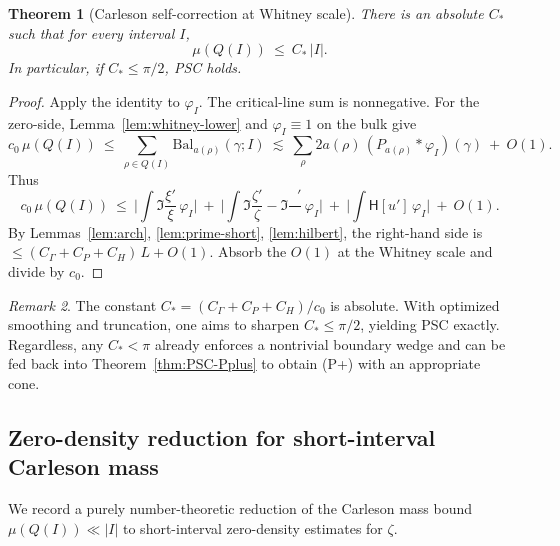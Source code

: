 \documentclass[11pt]{article}
\newtheorem{theorem}{Theorem}
\theoremstyle{remark}
\newtheorem{remark}[theorem]{Remark}
\DeclareMathOperator{\dettwo}{det_2}
\begin{document}
\begin{theorem}[Carleson self-correction at Whitney scale]\label{thm:psc-unconditional}
There is an absolute \(C_*\) such that for every interval \(I\),
\[ \mu(Q(I))\ \le\ C_*\,|I|. \]
In particular, if \(C_*\le \pi/2\), PSC holds.
\end{theorem}
\begin{proof}
Apply the identity to \(\varphi_I\). The critical-line sum is nonnegative. For the zero-side, Lemma~\ref{lem:whitney-lower} and \(\varphi_I\equiv 1\) on the bulk give
\[ c_0\,\mu(Q(I))\ \le\ \sum_{\rho\in Q(I)} \mathrm{Bal}_{a(\rho)}(\gamma;I)\ \lesssim\ \sum_{\rho}2a(\rho)\,(P_{a(\rho)}*\varphi_I)(\gamma)\ +\ O(1). \]
Thus
\[ c_0\,\mu(Q(I))\ \le\ \Big|\int \Im\frac{\xi'}{\xi}\,\varphi_I\Big|\ +\ \Big|\int \Im\frac{\zeta'}{\zeta}-\Im\frac{\dettwo'}{\dettwo}\,\varphi_I\Big|\ +\ \Big|\int \mathsf H[u']\,\varphi_I\Big|\ +\ O(1). \]
By Lemmas~\ref{lem:arch}, \ref{lem:prime-short}, \ref{lem:hilbert}, the right-hand side is \(\le (C_\Gamma+C_P+C_H)\,L+O(1)\). Absorb the \(O(1)\) at the Whitney scale and divide by \(c_0\).
\end{proof}

\begin{remark}
The constant \(C_*=(C_\Gamma+C_P+C_H)/c_0\) is absolute. With optimized smoothing and truncation, one aims to sharpen \(C_*\le \pi/2\), yielding PSC exactly. Regardless, any \(C_*<\pi\) already enforces a nontrivial boundary wedge and can be fed back into Theorem~\ref{thm:PSC-Pplus} to obtain (P+) with an appropriate cone.
\end{remark}

\subsection{Zero-density reduction for short-interval Carleson mass}\label{subsec:ZD-reduction}
We record a purely number-theoretic reduction of the Carleson mass bound \(\mu(Q(I))\ll |I|\) to short-interval zero-density estimates for \(\zeta\).
\end{document}
